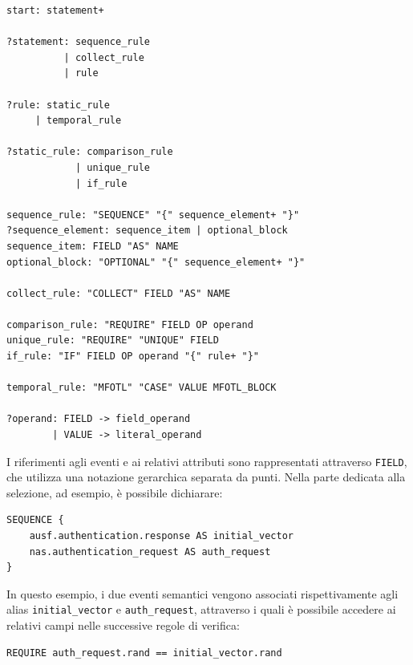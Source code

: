 \par\noindent\begin{minipage}{\linewidth}
\begin{lstlisting}
start: statement+

?statement: sequence_rule
          | collect_rule
          | rule

?rule: static_rule
     | temporal_rule

?static_rule: comparison_rule
            | unique_rule
            | if_rule

sequence_rule: "SEQUENCE" "{" sequence_element+ "}"
?sequence_element: sequence_item | optional_block
sequence_item: FIELD "AS" NAME
optional_block: "OPTIONAL" "{" sequence_element+ "}"

collect_rule: "COLLECT" FIELD "AS" NAME

comparison_rule: "REQUIRE" FIELD OP operand
unique_rule: "REQUIRE" "UNIQUE" FIELD
if_rule: "IF" FIELD OP operand "{" rule+ "}"

temporal_rule: "MFOTL" "CASE" VALUE MFOTL_BLOCK

?operand: FIELD -> field_operand
        | VALUE -> literal_operand
\end{lstlisting}
\end{minipage}\par

I riferimenti agli eventi e ai relativi attributi sono rappresentati attraverso \texttt{FIELD}, che utilizza una notazione gerarchica separata da punti. Nella parte dedicata alla selezione, ad esempio, è possibile dichiarare:

\par\noindent\begin{minipage}{\linewidth}
\begin{lstlisting}
SEQUENCE {
    ausf.authentication.response AS initial_vector
    nas.authentication_request AS auth_request
}
\end{lstlisting}
\end{minipage}\par

In questo esempio, i due eventi semantici vengono associati rispettivamente agli alias \texttt{initial\_vector} e \texttt{auth\_request}, attraverso i quali è possibile accedere ai relativi campi nelle successive regole di verifica:

\par\noindent\begin{minipage}{\linewidth}
\begin{lstlisting}
REQUIRE auth_request.rand == initial_vector.rand
\end{lstlisting}
\end{minipage}\par

